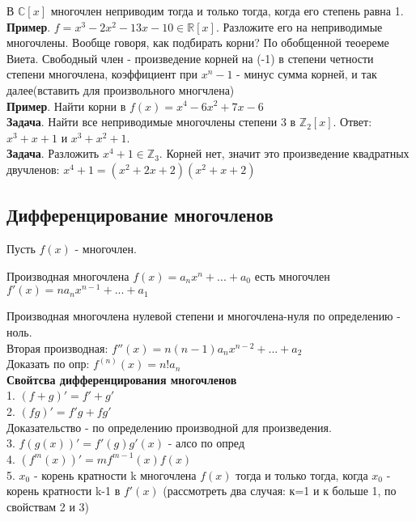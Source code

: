 В $\mathbb C[x]$ многочлен неприводим тогда и только тогда, когда его степень
равна 1.\\
\textbf{Пример}. $f=x^3-2x^2-13x-10\in\mathbb R[x]$. Разложите его на
неприводимые многочлены. Вообще говоря, как подбирать корни? По обобщенной
теоереме Виета. Свободный член - произведение корней на (-1) в степени четности 
степени многочлена, коэффициент при $x^n-1$ - минус сумма корней, и 
так далее(вставить для произвольного многчлена)\\
\textbf{Пример}. Найти корни в $f(x)=x^4-6x^2+7x-6$\\
\textbf{Задача}. Найти все неприводимые многочлены степени 3 в $\mathbb Z_2[x]$.
Ответ: $x^3+x+1$ и $x^3+x^2+1$.\\
\textbf{Задача}. Разложить $x^4+1\in\mathbb Z_3$. Корней нет, значит это 
произведение квадратных двучленов: $x^4+1=(x^2+2x+2)(x^2+x+2)$
\subsection{Дифференцирование многочленов}
Пусть $f(x)$ - многочлен. 
\begin{defin}
Производная многочлена $f(x)=a_nx^n+...+a_0$ есть многочлен 
$f'(x)=na_nx^{n-1}+...+a_1$
\end{defin}
Производная многочлена нулевой степени и многочлена-нуля по определению - ноль.\\
Вторая производная: $f''(x)=n(n-1)a_nx^{n-2}+...+a_2$\\
Доказать по опр: $f^{(n)}(x)=n!a_n$\\
\textbf{Свойтсва дифференцирования многочленов}\\
1. $(f+g)'=f'+g'$\\
2. $(fg)'=f'g+fg'$\\
Доказательство - по определению производной для произведения. \\
3. $f(g(x))'=f'(g)g'(x)$ - алсо по опред\\
4. $(f^m(x))'=mf^{m-1}(x)f(x)$\\
5. $x_0$ - корень кратности k многочлена $f(x)$ тогда и только тогда, когда
$x_0$ - корень кратности k-1 в $f'(x)$ (рассмотреть два случая: к=1 и
к больше 1, по свойствам 2 и 3)


